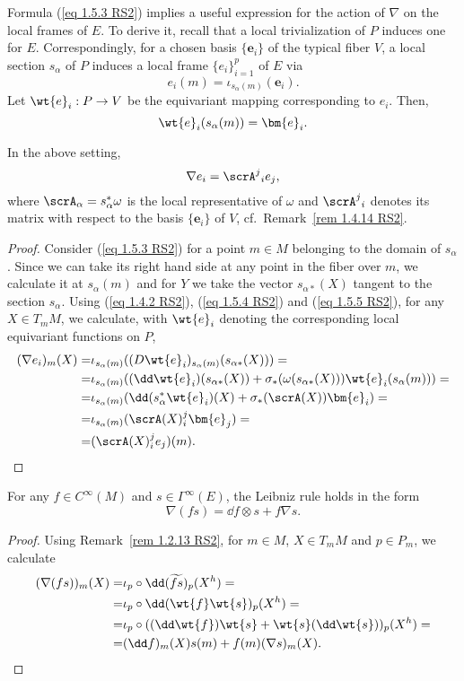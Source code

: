 Formula (\ref{eq 1.5.3 RS2}) implies a useful expression for the action of $\nabla$ on the local frames of $E$. To derive it, recall that a local trivialization of $P$ induces one for $E$. Correspondingly, for a chosen basis $\{\bm{e}_i\}$ of the typical fiber $V$, a local section $s_\alpha$ of $P$ induces a local frame $\{e_i\}_{i=1}^p$ of $E$ via
\[e_i(m)=\iota_{s_\alpha(m)}(\bm{e}_i).\label{eq 1.5.4 RS2}\]
Let $\wt{e}_i:P\to V$ be the equivariant mapping corresponding to $e_i$. Then,
\[\wt{e}_i(s_\alpha(m))=\bm{e}_i.\label{eq 1.5.5 RS2}\]

\begin{prop}[{{\cite[Prop.~1.5.3]{RS2}}}]\label{prop 1.5.3 RS2}
    In the above setting,
    \[\nabla e_i=\scrA^j{}_i e_j,\label{eq 1.5.6 RS2}\]
    where $\scrA_\alpha=s_\alpha^\ast\omega$ is the local representative of $\omega$ and $\scrA^j{}_i$ denotes its matrix with respect to the basis $\{\bm{e}_i\}$ of $V$, cf.\ Remark~\ref{rem 1.4.14 RS2}.
\end{prop}
\begin{proof}
    Consider (\ref{eq 1.5.3 RS2}) for a point $m\in M$ belonging to the domain of $s_\alpha$. Since we can take its right hand side at any point in the fiber over $m$, we calculate it at $s_\alpha(m)$ and for $Y$ we take the vector $s_{\alpha\ast}(X)$ tangent to the section $s_\alpha$. Using (\ref{eq 1.4.2 RS2}), (\ref{eq 1.5.4 RS2}) and (\ref{eq 1.5.5 RS2}), for any $X\in T_mM$, we calculate, with $\wt{e}_i$ denoting the corresponding local equivariant functions on $P$,
    \begin{align}
        (\nabla e_i)_m(X)=&\iota_{s_\alpha(m)}((D\wt{e}_i)_{s_\alpha(m)}(s_{\alpha\ast}(X)))=\\
        =&\iota_{s_\alpha(m)}((\dd\wt{e}_i)(s_{\alpha\ast}(X))+\sigma_\ast(\omega(s_{\alpha\ast}(X)))\wt{e}_i(s_\alpha(m)))=\\
        =&\iota_{s_\alpha(m)}(\dd(s_\alpha^\ast\wt{e}_i)(X)+\sigma_\ast(\scrA(X))\bm{e}_i)=\\
        =&\iota_{s_\alpha(m)}(\scrA(X)^j_i\bm{e}_j)=\\
        =&(\scrA(X)^j_i e_j)(m).
    \end{align}
\end{proof}

\begin{prop}[{{\cite[Prop.~1.5.4]{RS2}}}]\label{prop 1.5.4 RS2}
    For any $f\in C^\infty(M)$ and $s\in\Gamma^\infty(E)$, the Leibniz rule holds in the form
    \[\nabla(f s)=\dd f\otimes s+f\nabla s.\label{eq 1.5.7 RS2}\]
\end{prop}
\begin{proof}
    Using Remark~\ref{rem 1.2.13 RS2}, for $m\in M$, $X\in T_mM$ and $p\in P_m$, we calculate
    \begin{align}
        (\nabla(fs))_m(X)=&\iota_p\circ \dd(\widetilde{fs})_p (X^h)=\\
        =&\iota_p\circ \dd(\wt{f}\wt{s})_p(X^h)=\\
        =&\iota_p\circ ((\dd\wt{f})\wt{s}+\wt{s}(\dd\wt{s}))_p(X^h)=\\
        =&(\dd f)_m(X)s(m)+f(m)(\nabla s)_m(X).
    \end{align}
\end{proof}

